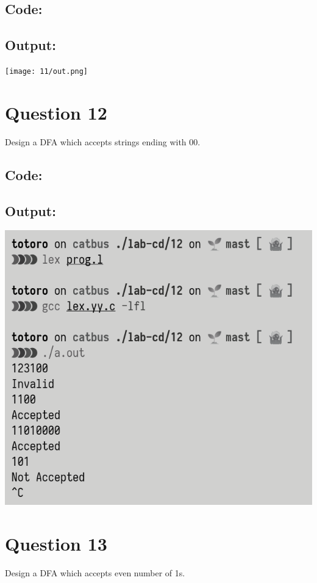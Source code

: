 \documentclass{article}
\begin{document}
\subsection*{Code:}

\newpage
\subsection*{Output:}
\begin{center}
  \texttt{[image: 11/out.png]}
\end{center}

\newpage
\section*{Question 12}
Design a DFA which accepts strings ending with 00.
\subsection*{Code:}

\newpage
\subsection*{Output:}
\begin{center}
  \includegraphics[width=14cm]{12/out.png}
\end{center}

\newpage
\section*{Question 13}
Design a DFA which accepts even number of 1s.
\end{document}
